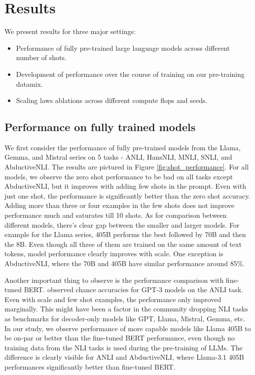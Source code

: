 \section{Results}

We present results for three major settings:
\begin{itemize}
    \item Performance of fully pre-trained large language models across different number of shots.
    \item Development of performance over the course of training on our pre-training datamix.
    \item Scaling laws ablations across different compute flops and seeds.
\end{itemize}

\subsection{Performance on fully trained models}

We first consider the performance of fully pre-trained models from the Llama, Gemma, and Mistral series on 5 tasks - ANLI, HansNLI, MNLI, SNLI, and AbductiveNLI. The results are pictured in Figure \ref{fig:shot_performance}. For all models, we observe the zero shot performance to be bad on all tasks except AbductiveNLI, but it improves with adding few shots in the prompt. Even with just one shot, the performance is significantly better than the zero shot accuracy. Adding more than three or four examples in the few shots does not improve performance much and saturates till 10 shots. As for comparison between different models, there's clear gap between the smaller and larger models. For example for the Llama series, 405B performs the best followed by 70B and then the 8B. Even though all three of them are trained on the same amount of text tokens, model performance clearly improves with scale. One exception is AbductiveNLI, where the 70B and 405B have similar performance around 85\%.

Another important thing to observe is the performance comparison with fine-tuned BERT. \citet{brown2020languagemodelsfewshotlearners} observed chance accuracies for GPT-3 models on the ANLI task. Even with scale and few shot examples, the performance only improved marginally. This might have been a factor in the community dropping NLI tasks as benchmarks for decoder-only models like GPT, Llama, Mistral, Gemma, etc. In our study, we observe performance of more capable models like Llama 405B to be on-par or better than the fine-tuned BERT performance, even though no training data from the NLI tasks is used during the pre-training of LLMs. The difference is clearly visible for ANLI and AbductiveNLI, where Llama-3.1 405B performances significantly better than fine-tuned BERT.

